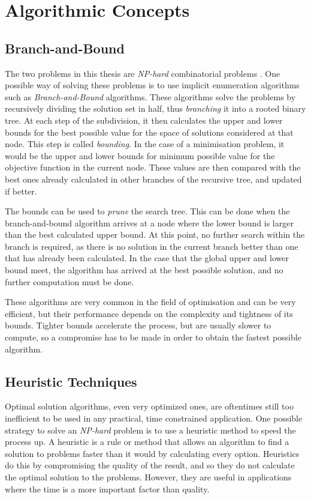 \section{Algorithmic Concepts}
\subsection{Branch-and-Bound}
The two problems in this thesis are \emph{NP-hard} combinatorial problems \cite{complex,gdccomplex}. One possible way of solving these problems is to use implicit enumeration algorithms such as \emph{Branch-and-Bound} algorithms.
These algorithms solve the problems by recursively dividing the solution set in half, thus \emph{branching} it into a rooted binary tree.
At each step of the subdivision, it then calculates the upper and lower bounds for the best possible value for the space of solutions considered at that node. This step is called \emph{bounding}.
In the case of a minimisation problem, it would be the upper and lower bounds for minimum possible value for the objective function in the current node. These values are then compared with the best ones already calculated in other branches of the recursive tree, and updated if better.

The bounds can be used to \emph{prune} the search tree. This can be done when the branch-and-bound algorithm arrives at a node where the lower bound is larger than the best calculated upper bound. At this point, no further search within the branch is required, as there is no solution in the current branch better than one that has already been calculated. 
In the case that the global upper and lower bound meet, the algorithm has arrived at the best possible solution, and no further computation must be done.

These algorithms are very common in the field of optimisation and can be very efficient, but their performance depends on the complexity and tightness of its bounds. Tighter bounds accelerate the process, but are usually slower to compute, so a compromise has to be made in order to obtain the fastest possible algorithm.

\subsection{Heuristic Techniques}
Optimal solution algorithms, even very optimized ones, are oftentimes still too inefficient to be used in any practical, time constrained application. One possible strategy to solve an \emph{NP-hard} problem is to use a heuristic method to speed the process up. A heuristic is a rule or method that allows an algorithm to find a solution to problems faster than it would by calculating every option. Heuristics do this by compromising the quality of the result, and so they do not calculate the optimal solution to the problems. However, they are useful in applications where the time is a more important factor than quality.

